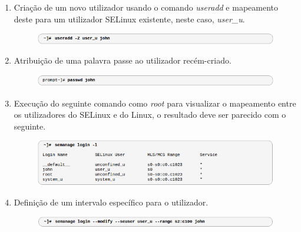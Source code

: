 \documentclass[../tp2.tex]{subfiles}
\begin{document}
\begin{enumerate}
\item Criação de um novo utilizador usando o comando \textit{useradd} e mapeamento deste para um utilizador SELinux existente, neste caso, \textit{user\_u}.\par 

\begin{figure}[H]
\centering
\captionsetup{justification=centering,margin=2cm}
\centerline{\includegraphics[scale=0.7]{../imagens/adduser.png}}
\end{figure}

\item Atribuição de uma palavra passe ao utilizador recém-criado.\par 
\begin{figure}[H]
\centering
\captionsetup{justification=centering,margin=2cm}
\centerline{\includegraphics[scale=0.7]{../imagens/pass.png}}
\end{figure}

\item Execução do seguinte comando como \textit{root} para visualizar o mapeamento entre os utilizadores do SELinux e do Linux, o resultado deve ser parecido com o seguinte.
\begin{figure}[H]
\centering
\captionsetup{justification=centering,margin=2cm}
\centerline{\includegraphics[scale=0.7]{../imagens/users.png}}
\end{figure}

\item Definição de um intervalo específico para o utilizador.\par 
\begin{figure}[H]
\centering
\captionsetup{justification=centering,margin=2cm}
\centerline{\includegraphics[scale=0.7]{../imagens/range.png}}
\end{figure}


\end{enumerate}
\end{document}
